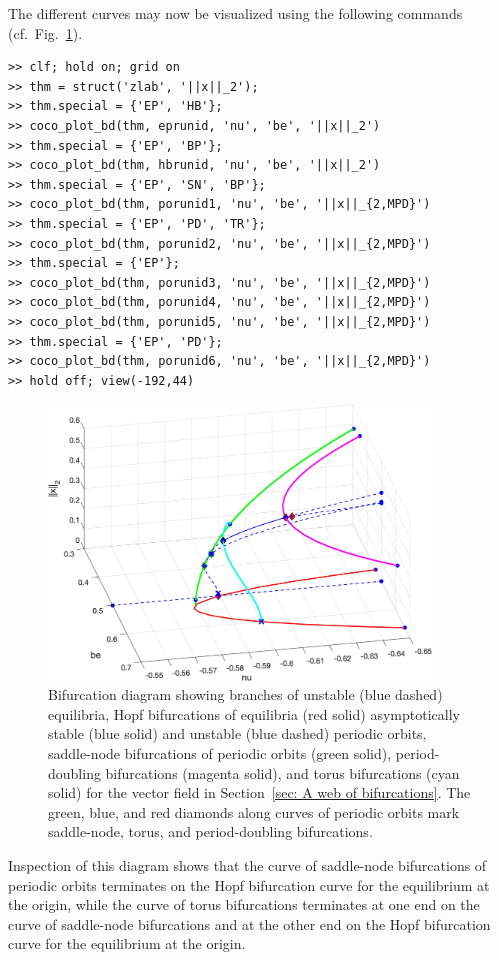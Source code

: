The different curves may now be visualized using the following commands (cf.\ Fig.~\ref{fig: Section4_3_1}).
\begin{lstlisting}[language=coco-highlight,frame=lines]
>> clf; hold on; grid on
>> thm = struct('zlab', '||x||_2');
>> thm.special = {'EP', 'HB'};
>> coco_plot_bd(thm, eprunid, 'nu', 'be', '||x||_2')
>> thm.special = {'EP', 'BP'};
>> coco_plot_bd(thm, hbrunid, 'nu', 'be', '||x||_2')
>> thm.special = {'EP', 'SN', 'BP'};
>> coco_plot_bd(thm, porunid1, 'nu', 'be', '||x||_{2,MPD}')
>> thm.special = {'EP', 'PD', 'TR'};
>> coco_plot_bd(thm, porunid2, 'nu', 'be', '||x||_{2,MPD}')
>> thm.special = {'EP'};
>> coco_plot_bd(thm, porunid3, 'nu', 'be', '||x||_{2,MPD}')
>> coco_plot_bd(thm, porunid4, 'nu', 'be', '||x||_{2,MPD}')
>> coco_plot_bd(thm, porunid5, 'nu', 'be', '||x||_{2,MPD}')
>> thm.special = {'EP', 'PD'};
>> coco_plot_bd(thm, porunid6, 'nu', 'be', '||x||_{2,MPD}')
>> hold off; view(-192,44)
\end{lstlisting}
\begin{figure}[h]
\centering
\includegraphics[width=4in]{Figures/Section4_3_1.jpg}
\caption{Bifurcation diagram showing branches of unstable (blue dashed) equilibria, Hopf bifurcations of equilibria (red solid) asymptotically stable (blue solid) and unstable (blue dashed) periodic orbits, saddle-node bifurcations of periodic orbits (green solid), period-doubling bifurcations (magenta solid), and torus bifurcations (cyan solid)  for the vector field in Section~\ref{sec: A web of bifurcations}. The green, blue, and red diamonds along curves of periodic orbits mark saddle-node, torus, and period-doubling bifurcations.}
\label{fig: Section4_3_1}
\end{figure}
Inspection of this diagram shows that the curve of saddle-node bifurcations of periodic orbits terminates on the Hopf bifurcation curve for the equilibrium at the origin, while the curve of torus bifurcations terminates at one end on the curve of saddle-node bifurcations and at the other end on the Hopf bifurcation curve for the equilibrium at the origin.

